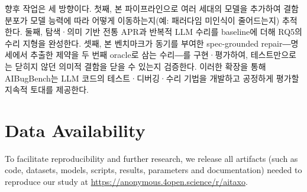 \documentclass[10pt,conference]{IEEEtran}
\begin{document}
향후 작업은 세 방향이다. 첫째, 본 파이프라인으로 여러 세대의 모델을 추가하여 결함 분포가 모델 능력에 따라 어떻게 이동하는지(예: 패러다임 미인식이 줄어드는지) 추적한다. 둘째, 탐색·의미 기반 전통 APR과 반복적 LLM 수리를 baseline에 더해 RQ5의 수리 지형을 완성한다. 셋째, 본 벤치마크가 동기를 부여한 spec-grounded repair―명세에서 추출한 제약을 두 번째 oracle로 삼는 수리―를 구현·평가하여, 테스트만으로는 닫히지 않던 의미적 결함을 닫을 수 있는지 검증한다. 이러한 확장을 통해 AIBugBench는 LLM 코드의 테스트·디버깅·수리 기법을 개발하고 공정하게 평가할 지속적 토대를 제공한다.

\section*{Data Availability}
To facilitate reproducibility and further research, we release all artifacts (such as code, datasets, models, scripts, results, parameters and documentation) needed to reproduce our study at \url{https://anonymous.4open.science/r/aitaxo}.



\end{document}
